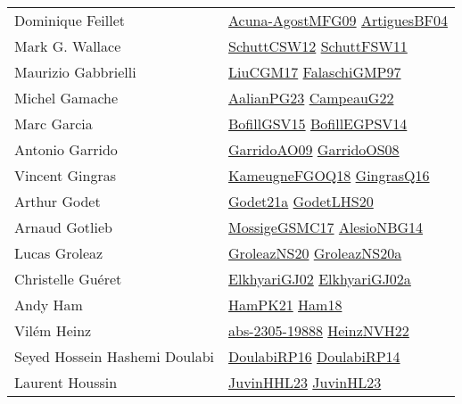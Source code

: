 {\begin{longtable}{p{4cm}p{20cm}}
Dominique Feillet & \href{papers/Acuna-AgostMFG09.pdf}{Acuna-AgostMFG09}\cite{Acuna-AgostMFG09} \href{papers/ArtiguesBF04.pdf}{ArtiguesBF04}\cite{ArtiguesBF04} \\
Mark G. Wallace & \href{papers/SchuttCSW12.pdf}{SchuttCSW12}\cite{SchuttCSW12} \href{articles/SchuttFSW11.pdf}{SchuttFSW11}\cite{SchuttFSW11} \\
Maurizio Gabbrielli & \href{papers/LiuCGM17.pdf}{LiuCGM17}\cite{LiuCGM17} \href{articles/FalaschiGMP97.pdf}{FalaschiGMP97}\cite{FalaschiGMP97} \\
Michel Gamache & \href{papers/AalianPG23.pdf}{AalianPG23}\cite{AalianPG23} \href{articles/CampeauG22.pdf}{CampeauG22}\cite{CampeauG22} \\
Marc Garcia & \href{papers/BofillGSV15.pdf}{BofillGSV15}\cite{BofillGSV15} \href{papers/BofillEGPSV14.pdf}{BofillEGPSV14}\cite{BofillEGPSV14} \\
Antonio Garrido & \href{articles/GarridoAO09.pdf}{GarridoAO09}\cite{GarridoAO09} \href{articles/GarridoOS08.pdf}{GarridoOS08}\cite{GarridoOS08} \\
Vincent Gingras & \href{papers/KameugneFGOQ18.pdf}{KameugneFGOQ18}\cite{KameugneFGOQ18} \href{papers/GingrasQ16.pdf}{GingrasQ16}\cite{GingrasQ16} \\
Arthur Godet & \href{}{Godet21a}\cite{Godet21a} \href{papers/GodetLHS20.pdf}{GodetLHS20}\cite{GodetLHS20} \\
Arnaud Gotlieb & \href{papers/MossigeGSMC17.pdf}{MossigeGSMC17}\cite{MossigeGSMC17} \href{papers/AlesioNBG14.pdf}{AlesioNBG14}\cite{AlesioNBG14} \\
Lucas Groleaz & \href{papers/GroleazNS20.pdf}{GroleazNS20}\cite{GroleazNS20} \href{papers/GroleazNS20a.pdf}{GroleazNS20a}\cite{GroleazNS20a} \\
Christelle Gu{\'{e}}ret & \href{papers/ElkhyariGJ02.pdf}{ElkhyariGJ02}\cite{ElkhyariGJ02} \href{papers/ElkhyariGJ02a.pdf}{ElkhyariGJ02a}\cite{ElkhyariGJ02a} \\
Andy Ham & \href{articles/HamPK21.pdf}{HamPK21}\cite{HamPK21} \href{}{Ham18}\cite{Ham18} \\
Vil{\'{e}}m Heinz & \href{articles/abs-2305-19888.pdf}{abs-2305-19888}\cite{abs-2305-19888} \href{articles/HeinzNVH22.pdf}{HeinzNVH22}\cite{HeinzNVH22} \\
Seyed Hossein Hashemi Doulabi & \href{}{DoulabiRP16}\cite{DoulabiRP16} \href{papers/DoulabiRP14.pdf}{DoulabiRP14}\cite{DoulabiRP14} \\
Laurent Houssin & \href{papers/JuvinHHL23.pdf}{JuvinHHL23}\cite{JuvinHHL23} \href{papers/JuvinHL23.pdf}{JuvinHL23}\cite{JuvinHL23} \\

\end{longtable}}
